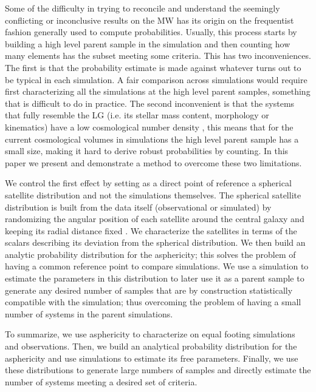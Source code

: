 \documentclass[a4paper,fleqn,usenatbib]{mnras}
\begin{document}
Some of the difficulty in trying to reconcile and understand the
seemingly conflicting or inconclusive results on the MW has its origin on
the frequentist fashion generally used to compute probabilities.
Usually, this process starts by building a high level parent sample in the
simulation and then counting how many elements has the subset
meeting some criteria. 
This has two inconveniences.
The first is that the probability estimate is made against whatever
turns out to be typical in each simulation. 
A fair comparison across simulations would require first
characterizing all the simulations at the high level parent samples,
something that is difficult to do in practice. 
The second inconvenient is that the systems that fully resemble
the LG (i.e. its stellar mass content, morphology or kinematics) have
a low cosmological number density \citep{ForeroRomero2013}, this means
that for the current cosmological volumes in simulations the high
level parent sample has a small size, making it hard to derive robust
probabilities by counting.    
In this paper we present and demonstrate a method to overcome these two
limitations.

We control the first effect by setting as a direct point of reference
a spherical satellite distribution and not the simulations themselves.
The spherical satellite distribution is built from the data itself
(observational or simulated) by randomizing the angular position
of each satellite around the central galaxy and keeping its radial
distance fixed \citep{2017AN....338..854P}. 
We characterize the satellites in terms of the scalars describing its
deviation from the spherical distribution. 
We then build an analytic probability distribution for the
asphericity; this solves the problem of having a common reference
point to compare simulations.  
We use a simulation to estimate the parameters in this distribution to
later use it as a parent sample to generate any desired number of
samples that are by construction statistically compatible with the
simulation; thus overcoming the problem of having a small number of
systems in the parent simulations. 

To summarize, we use asphericity to characterize on equal footing
simulations and observations.  
Then, we build an analytical probability distribution  for the
asphericity and use simulations to estimate its free parameters.  
Finally, we use these distributions to generate large numbers of
samples and directly estimate the number of systems meeting a desired
set of criteria.
\end{document}
